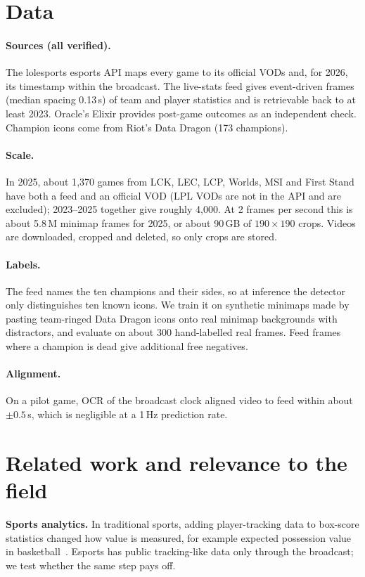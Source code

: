 \documentclass{article}
\begin{document}
\section{Data}
\paragraph{Sources (all verified).}
The lolesports esports API maps every game to its official VODs and, for 2026, its timestamp within the broadcast.
The live-stats feed gives event-driven frames (median spacing 0.13\,s) of team and player statistics and is retrievable back to at least 2023.
Oracle's Elixir provides post-game outcomes as an independent check.
Champion icons come from Riot's Data Dragon (173 champions).

\paragraph{Scale.}
In 2025, about 1{,}370 games from LCK, LEC, LCP, Worlds, MSI and First Stand have both a feed and an official VOD (LPL VODs are not in the API and are excluded); 2023--2025 together give roughly 4{,}000.
At 2 frames per second this is about 5.8\,M minimap frames for 2025, or about 90\,GB of $190\times190$ crops.
Videos are downloaded, cropped and deleted, so only crops are stored.

\paragraph{Labels.}
The feed names the ten champions and their sides, so at inference the detector only distinguishes ten known icons.
We train it on synthetic minimaps made by pasting team-ringed Data Dragon icons onto real minimap backgrounds with distractors, and evaluate on about 300 hand-labelled real frames.
Feed frames where a champion is dead give additional free negatives.

\paragraph{Alignment.}
On a pilot game, OCR of the broadcast clock aligned video to feed within about $\pm0.5$\,s, which is negligible at a 1\,Hz prediction rate.

\section{Related work and relevance to the field}
\textbf{Sports analytics.} In traditional sports, adding player-tracking data to box-score statistics changed how value is measured, for example expected possession value in basketball~\cite{epv}. Esports has public tracking-like data only through the broadcast; we test whether the same step pays off.
\end{document}
